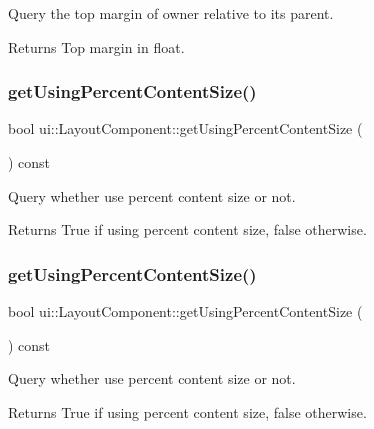 Query the top margin of owner relative to its parent. \begin{DoxyReturn}{Returns}
Top margin in float. 
\end{DoxyReturn}
\mbox{\label{classui_1_1LayoutComponent_abd8b705e269551116208cec448cd230e}} 
\subsubsection{\texorpdfstring{get\+Using\+Percent\+Content\+Size()}{getUsingPercentContentSize()}\hspace{0.1cm}{\footnotesize\ttfamily [1/2]}}
{\footnotesize\ttfamily bool ui\+::\+Layout\+Component\+::get\+Using\+Percent\+Content\+Size (\begin{DoxyParamCaption}{ }\end{DoxyParamCaption}) const}

Query whether use percent content size or not. \begin{DoxyReturn}{Returns}
True if using percent content size, false otherwise. 
\end{DoxyReturn}
\mbox{\label{classui_1_1LayoutComponent_abd8b705e269551116208cec448cd230e}} 
\subsubsection{\texorpdfstring{get\+Using\+Percent\+Content\+Size()}{getUsingPercentContentSize()}\hspace{0.1cm}{\footnotesize\ttfamily [2/2]}}
{\footnotesize\ttfamily bool ui\+::\+Layout\+Component\+::get\+Using\+Percent\+Content\+Size (\begin{DoxyParamCaption}{ }\end{DoxyParamCaption}) const}

Query whether use percent content size or not. \begin{DoxyReturn}{Returns}
True if using percent content size, false otherwise. 
\end{DoxyReturn}
\mbox{\label{classui_1_1LayoutComponent_ae45307b95fdd670f3439e3a75369dff9}} 
